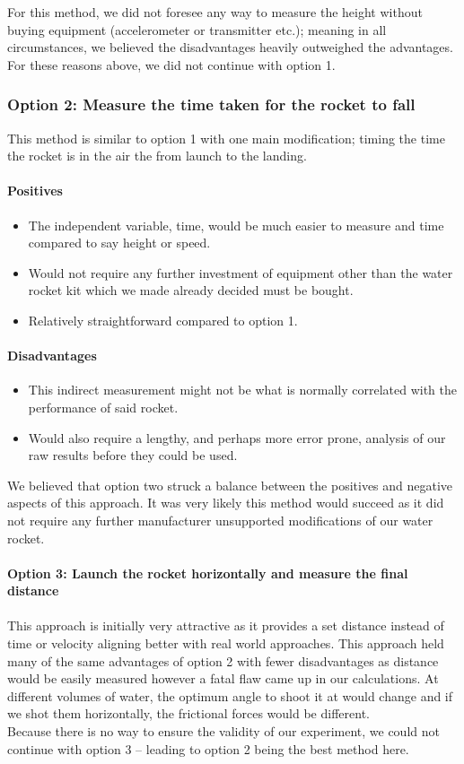 \documentclass[14pt]{article}
\begin{document}
For this method, we did not foresee any way to measure the height without buying equipment (accelerometer or transmitter etc.); meaning in all circumstances, we believed the disadvantages heavily outweighed the advantages. 
\\
For these reasons above, we did not continue with option 1.
\subsubsection{Option 2: Measure the time taken for the rocket to fall}
This method is similar to option 1 with one main modification; timing the time the rocket is in the air the from launch to the landing.
\paragraph{Positives}
\begin{itemize}
    \item The independent variable, time, would be much easier to measure and time compared to say height or speed.
    \item Would not require any further investment of equipment other than the water rocket kit which we made already decided must be bought.
    \item Relatively straightforward compared to option 1.
\end{itemize}
\paragraph{Disadvantages}
\begin{itemize}
    \item This indirect measurement might not be what is normally correlated with the performance of said rocket.
    \item Would also require a lengthy, and perhaps more error prone, analysis of our raw results before they could be used.
\end{itemize}
We believed that option two struck a balance between the positives and negative aspects of this approach. It was very likely this method would succeed as it did not require any further manufacturer unsupported modifications of our water rocket.
\paragraph{Option 3: Launch the rocket horizontally and measure the final distance}
\paragraph{}
This approach is initially very attractive as it provides a set distance instead of time or velocity aligning better with real world approaches. This approach held many of the same advantages of option 2 with fewer disadvantages as distance would be easily measured however a fatal flaw came up in our calculations. At different volumes of water, the optimum angle to shoot it at would change and if we shot them horizontally, the frictional forces would be different. \\
Because there is no way to ensure the validity of our experiment, we could not continue with option 3 -- leading to option 2 being the best method here.
\end{document}
